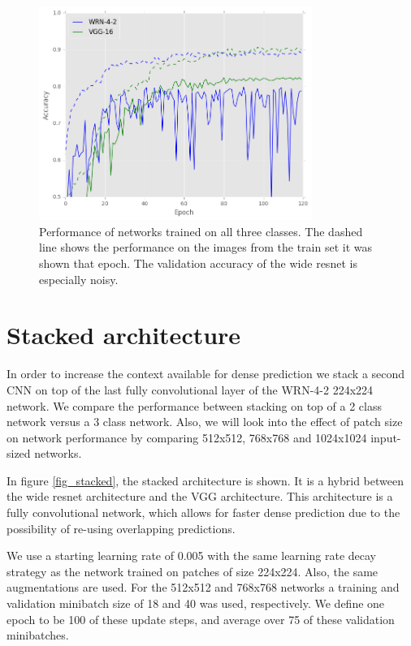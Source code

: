 \documentclass[journal]{IEEEtran}
\begin{document}
\begin{figure}[!t]
\centering{}
\hspace{-0.3cm}\includegraphics[width=3.5in]{3class_performance}
\vspace{-0.35cm}\caption{Performance of networks trained on all three classes. The dashed line shows the performance on the images from the train set it was shown that epoch. The validation accuracy of the wide resnet is especially noisy.}
\label{fig_3class}
\end{figure}




\section{Stacked architecture}

In order to increase the context available for dense prediction we stack a second CNN on top of the last fully convolutional layer of the WRN-4-2 224x224 network. We compare the performance between stacking on top of a 2 class network versus a 3 class network. Also, we will look into the effect of patch size on network performance by comparing 512x512, 768x768 and 1024x1024 input-sized networks. 

In figure \ref{fig_stacked}, the stacked architecture is shown. It is a hybrid between the wide resnet architecture and the VGG architecture. This architecture is a fully convolutional network, which allows for faster dense prediction due to the possibility of re-using overlapping predictions. 

We use a starting learning rate of 0.005 with the same learning rate decay strategy as the network trained on patches of size 224x224. Also, the same augmentations are used. For the 512x512 and 768x768 networks a training and validation minibatch size of 18 and 40 was used, respectively. We define one epoch to be 100 of these update steps, and average over 75 of these validation minibatches.
\end{document}
